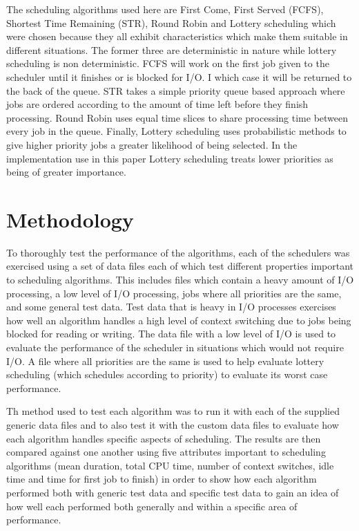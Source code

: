 \documentclass{acm_proc_article-sp}
\begin{document}
The scheduling algorithms used here are First Come, First Served (FCFS), Shortest Time Remaining (STR), Round Robin and Lottery scheduling which were chosen because they all exhibit characteristics which make them suitable in different situations. The former three are deterministic in nature while lottery scheduling is non deterministic. FCFS will work on the first job given to the scheduler until it finishes or is blocked for I/O. I which case it will be returned to the back of the queue. STR takes a simple priority queue based approach where jobs are ordered according to the amount of time left before they finish processing. Round Robin uses equal time slices to share processing time between every job in the queue. Finally, Lottery scheduling uses probabilistic methods to give higher priority jobs a greater likelihood of being selected. In the implementation use in this paper Lottery scheduling treats lower priorities as being of greater importance.

\section{Methodology} 
\label{methodology}
To thoroughly test the performance of the algorithms, each of the schedulers was exercised using a set of data files each of which test different properties important to scheduling algorithms. This includes files which contain a heavy amount of I/O processing, a low level of I/O processing, jobs where all priorities are the same, and some general test data. Test data that is heavy in I/O processes exercises how well an algorithm handles a high level of context switching due to jobs being blocked for reading or writing. The data file with a low level of I/O is used to evaluate the performance of the scheduler in situations which would not require I/O. A file where all priorities are the same is used to help evaluate lottery scheduling (which schedules according to priority) to evaluate its worst case performance.

Th method used to test each algorithm was to run it with each of the supplied generic data files and to also test it with the custom data files to evaluate how each algorithm handles specific aspects of scheduling. The results are then compared against one another using five attributes important to scheduling algorithms (mean duration, total CPU time, number of context switches, idle time and time for first job to finish) in order to show how each algorithm performed both with generic test data and specific test data to gain an idea of how well each performed both generally and within a specific area of performance.
\end{document}
